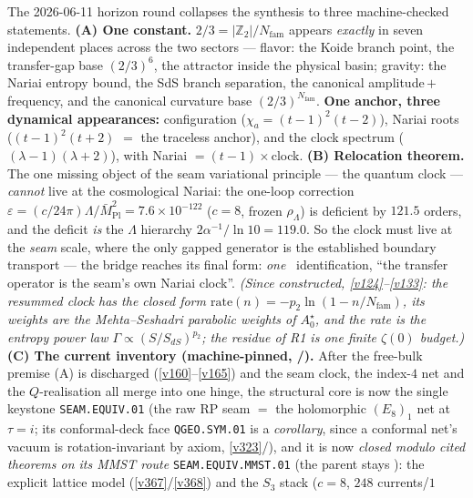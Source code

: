 \documentclass[11pt,a4paper]{article}
\newcommand{\Nfam}{N_{\mathrm{fam}}}
\newcommand{\Z}{\mathbb Z}
\newcommand{\ainv}{\alpha^{-1}}
\begin{document}
\begin{keybox}
The 2026-06-11 horizon round collapses the synthesis to three machine-checked statements.
\textbf{(A) One constant.} $2/3=|\Z_2|/\Nfam$ appears \emph{exactly} in seven independent places across
the two sectors --- flavor: the Koide branch point, the transfer-gap base $(2/3)^6$, the attractor inside
the physical basin; gravity: the Nariai entropy bound, the SdS branch separation, the canonical
amplitude\,$+$\,frequency, and the canonical curvature base $(2/3)^{\Nfam}$. \textbf{One anchor, three
dynamical appearances:} configuration ($\chi_a=(t{-}1)^2(t{-}2)$), Nariai roots ($(t{-}1)^2(t{+}2)$ $=$ the
traceless anchor), and the clock spectrum ($(\lambda{-}1)(\lambda{+}2)$), with Nariai $=(t{-}1)\times$clock.
\textbf{(B) Relocation theorem.} The one missing object of the seam variational principle --- the quantum
clock --- \emph{cannot} live at the cosmological Nariai: the one-loop correction
$\varepsilon=(c/24\pi)\Lambda/\bar M_{\mathrm{Pl}}^2=7.6\times10^{-122}$ ($c{=}8$, frozen $\rho_\Lambda$) is deficient by
$121.5$ orders, and the deficit \emph{is} the $\Lambda$ hierarchy $2\ainv/\ln10=119.0$. So the clock must
live at the \emph{seam} scale, where the only gapped generator is the established boundary transport ---
the bridge reaches its final form: \emph{one} \mC\ identification, ``the transfer operator is the seam's
own Nariai clock''. \emph{(Since constructed, \vref{v124}--\vref{v133}: the resummed clock has the closed form
$\mathrm{rate}(n)=-p_2\ln(1-n/N_{\mathrm{fam}})$, its weights are the Mehta--Seshadri parabolic weights of
$A_0^\star$, and the rate is the entropy power law $\Gamma\propto(S/S_{dS})^{p_2}$; the residue of R1 is
one finite $\zeta(0)$ budget.)} \textbf{(C) The current inventory (machine-pinned, /).}
After the free-bulk premise (A) is discharged (\vref{v160}--\vref{v165}) and the seam clock, the index-$4$
net and the $Q$-realisation all merge into one hinge, the structural core is now the single keystone
\texttt{SEAM.EQUIV.01} (the raw RP seam $=$ the holomorphic $(E_8)_1$ net at
$\tau{=}i$; its conformal-deck face \texttt{QGEO.SYM.01} is a \emph{corollary}, since a conformal net's vacuum is
rotation-invariant by axiom, \vref{v323}/), and it is now \emph{closed modulo
cited theorems on its MMST route} \texttt{SEAM.EQUIV.MMST.01} (the parent stays \mO): the explicit lattice model (\vref{v367}/\vref{v368}) and the $S_3$ stack ($c{=}8$, $248$ currents/$1$

\end{keybox}
\end{document}
